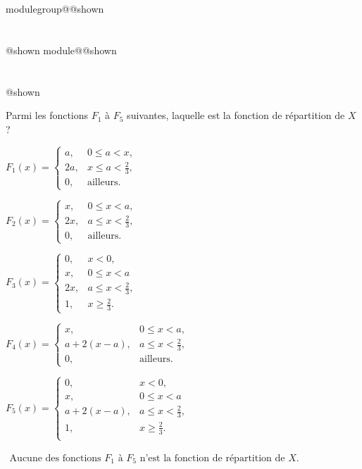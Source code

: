 \documentclass{Evaluation}
\makeatletter
\newcommand{\currentmodulekey}{}
\newcommand{\currentmoduletitle}{}
\newcommand{\currentgroupkey}{}
\newcommand{\currentgrouptitle}{}
\newcommand{\showmoduleifneeded}{%
  \ifx\currentgroupkey\empty\else
    \expandafter\ifx\csname modulegroup@\currentgroupkey @shown\endcsname\relax
      \section*{\currentgrouptitle}%
      \expandafter\gdef\csname modulegroup@\currentgroupkey @shown\endcsname{1}%
    \fi
  \fi
  \expandafter\ifx\csname module@\currentmodulekey @shown\endcsname\relax
    \section*{\currentmoduletitle}%
    \expandafter\gdef\csname module@\currentmodulekey @shown\endcsname{1}%
  \fi
}
\newenvironment{A25}{\showmoduleifneeded}{}
\makeatother
\begin{document}
\begin{questions}
\begin{A25}

Parmi les fonctions $F_1$ à $F_5$ suivantes, laquelle est la fonction de répartition
   de $X$ ?

 \begin{checkboxes}
     

     \choice $F_1(x)=\left\{\begin{array}{ll}
     a, & 0\le a<x, \\ 
     2a, & x\le a < \frac{2}{3}, \\ 
     0, & \text{ailleurs}.
     \end{array}\right.$


     \choice $F_2(x)=\left\{\begin{array}{ll}
     x, & 0\le x<a, \\ 
     2x, & a\le x < \frac{2}{3}, \\ 
     0, & \text{ailleurs}.
     \end{array}\right.$

     \choice $F_3(x)=\left\{\begin{array}{ll}
     0, & x<0,\\
     x, & 0\le x<a \\ 2x, & a\le x < \frac{2}{3}, \\ 
     1, & x\ge\frac{2}{3}.
     \end{array}\right.$

     \choice $F_4(x)=\left\{\begin{array}{ll}
     x, & 0\le x<a, \\ 
     a+2(x-a), & a\le x < \frac{2}{3}, \\ 
     0, & \text{ailleurs}.
     \end{array}\right.$
     
     \CorrectChoice $F_5(x)=\left\{\begin{array}{ll}
     0, & x<0,\\
     x, & 0\le x<a \\ 
     a+2(x-a), & a\le x < \frac{2}{3}, \\ 
     1, & x\ge\frac{2}{3}.\\
     \end{array}\right.$


     \choice $\begin{array}{ll}
     \text{Aucune des fonctions\ } 
     \text{$F_1$ à $F_5$ n'est la\ } 
     \text{fonction de répartition de $X$.}
     \end{array}$
  \end{checkboxes}\medskip


\end{A25}
\end{questions}
\end{document}

